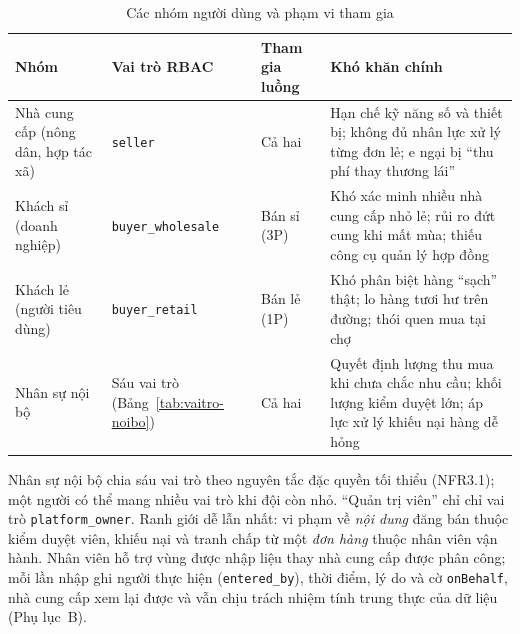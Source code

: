 \begingroup
\tblsetup\tblzebra
\begin{table}[H]
\centering
\small
\caption{Các nhóm người dùng và phạm vi tham gia}
\label{tab:nhomnguoidung}
\begin{tabular}{L{3.01cm} L{3.12cm} L{3.22cm} L{5.19cm}}
\toprule
{}
\textbf{Nhóm} & \textbf{Vai trò RBAC} & \textbf{Tham gia luồng} & \textbf{Khó khăn chính} \\
\midrule
Nhà cung cấp (nông dân, hợp tác xã) & \texttt{seller} & Cả hai & Hạn chế kỹ năng số và thiết bị; không đủ nhân lực xử lý từng đơn lẻ; e ngại bị ``thu phí thay thương lái'' \\
Khách sỉ (doanh nghiệp) & \texttt{buyer\_wholesale} & Bán sỉ (3P) & Khó xác minh nhiều nhà cung cấp nhỏ lẻ; rủi ro đứt cung khi mất mùa; thiếu công cụ quản lý hợp đồng \\
Khách lẻ (người tiêu dùng) & \texttt{buyer\_retail} & Bán lẻ (1P) & Khó phân biệt hàng ``sạch'' thật; lo hàng tươi hư trên đường; thói quen mua tại chợ \\
Nhân sự nội bộ & Sáu vai trò (Bảng~\ref{tab:vaitro-noibo}) & Cả hai & Quyết định lượng thu mua khi chưa chắc nhu cầu; khối lượng kiểm duyệt lớn; áp lực xử lý khiếu nại hàng dễ hỏng \\
\bottomrule
\end{tabular}
\end{table}
\endgroup

Nhân sự nội bộ chia sáu vai trò theo nguyên tắc đặc quyền tối thiểu (NFR3.1); một người có thể mang nhiều vai trò khi đội còn nhỏ. ``Quản trị viên'' chỉ chỉ vai trò \texttt{platform\_owner}. Ranh giới dễ lẫn nhất: vi phạm về \emph{nội dung} đăng bán thuộc kiểm duyệt viên, khiếu nại và tranh chấp từ một \emph{đơn hàng} thuộc nhân viên vận hành. Nhân viên hỗ trợ vùng được nhập liệu thay nhà cung cấp được phân công; mỗi lần nhập ghi người thực hiện (\texttt{entered\_by}), thời điểm, lý do và cờ \texttt{onBehalf}, nhà cung cấp xem lại được và vẫn chịu trách nhiệm tính trung thực của dữ liệu (Phụ lục~B).

